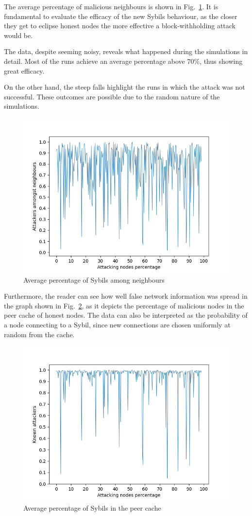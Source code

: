 \documentclass[12pt, letterpaper, twoside]{article}
\begin{document}
The average percentage of malicious neighbours is shown in Fig.~\ref{fig:avgatk}. It is fundamental to evaluate the efficacy of the new Sybils behaviour, as the closer they get to eclipse honest nodes the more effective a block-withholding attack would be.

The data, despite seeming noisy, reveals what happened during the simulations in detail. Most of the runs achieve an average percentage above $70\%$, thus showing great efficacy. 

On the other hand, the steep falls highlight the runs in which the attack was not successful. These outcomes are possible due to the random nature of the simulations.\\

\begin{figure}[h!]
	\includegraphics[width=.7\textwidth]{pict/results/in-hon-avg-neigh-atk.png}
	\centering
	\caption{Average percentage of Sybils among neighbours}
	\label{fig:avgatk}
\end{figure}

Furthermore, the reader can see how well false network information was spread in the graph shown in Fig.~\ref{fig:avgatk-known}, as it depicts the percentage of malicious nodes in the peer cache of honest nodes. The data can also be interpreted as the probability of a node connecting to a Sybil, since new connections are chosen uniformly at random from the cache.\\

\begin{figure}[h!]
	\includegraphics[width=.7\textwidth]{pict/results/in-hon-avg-known-atk.png}
	\centering
	\caption{Average percentage of Sybils in the peer cache}
	\label{fig:avgatk-known}
\end{figure}
\end{document}

